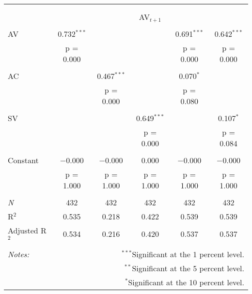 
\begin{tabular}{@{\extracolsep{5pt}}lccccc} 
\\[-1.8ex]\hline 
\hline \\[-1.8ex] 
\\[-1.8ex] & \multicolumn{5}{c}{AV$_{t+1}$} \\ 
\hline \\[-1.8ex] 
 AV & 0.732$^{***}$ &  &  & 0.691$^{***}$ & 0.642$^{***}$ \\ 
  & p = 0.000 &  &  & p = 0.000 & p = 0.000 \\ 
  & & & & & \\ 
 AC &  & 0.467$^{***}$ &  & 0.070$^{*}$ &  \\ 
  &  & p = 0.000 &  & p = 0.080 &  \\ 
  & & & & & \\ 
 SV &  &  & 0.649$^{***}$ &  & 0.107$^{*}$ \\ 
  &  &  & p = 0.000 &  & p = 0.084 \\ 
  & & & & & \\ 
 Constant & $-$0.000 & $-$0.000 & 0.000 & $-$0.000 & $-$0.000 \\ 
  & p = 1.000 & p = 1.000 & p = 1.000 & p = 1.000 & p = 1.000 \\ 
  & & & & & \\ 
\textit{N} & 432 & 432 & 432 & 432 & 432 \\ 
R$^{2}$ & 0.535 & 0.218 & 0.422 & 0.539 & 0.539 \\ 
Adjusted R$^{2}$ & 0.534 & 0.216 & 0.420 & 0.537 & 0.537 \\ 
\hline 
\hline \\[-1.8ex] 
\textit{Notes:} & \multicolumn{5}{r}{$^{***}$Significant at the 1 percent level.} \\ 
 & \multicolumn{5}{r}{$^{**}$Significant at the 5 percent level.} \\ 
 & \multicolumn{5}{r}{$^{*}$Significant at the 10 percent level.} \\ 
\end{tabular} 
